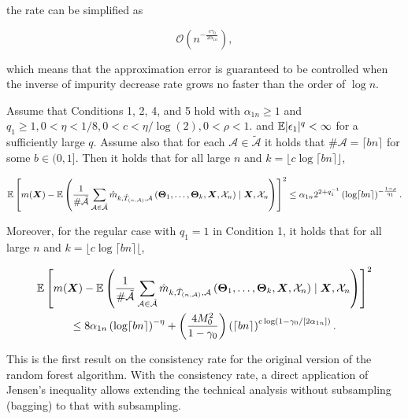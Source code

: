 the rate can be simplified as 

\[
\mathcal{O}\left(n^{- \frac{c \gamma_0}{2 \alpha_{1n}}} \right),
\]

which means that the approximation error is guaranteed to be controlled when the inverse of impurity decrease rate grows no faster than the order of \(\log n\).

\begin{theorem}\label{stat.learn.cons.rf.rates}

Assume that Conditions 1, 2, 4, and 5 hold with \(\alpha_{1n} \geq 1\) and \(q_1 \geq 1, 0 < \eta < 1/8, 0 < c < \eta/\log(2), 0 < \rho < 1\). and \(\mathbb{E} | \epsilon_1|^q < \infty\) for a sufficiently large \(q\). Assume also that for each \(\mathcal{A} \in \tilde{\mathcal{A}}\) it holds that \(\# \mathcal{A} = \lceil b n \rceil\) for some \(b \in (0,1]\). Then it holds that for all large \(n\) and \(k = \lfloor c \log \lceil b n \rceil \rfloor\),

\[
\mathbb{E} \left[ m(\boldsymbol{X}) - \mathbb{E} \left( \frac{1}{\# \tilde{\mathcal{A}}} \sum_{\mathcal{A} \in \tilde{\mathcal{A}}} \hat{m}_{k, \hat{T}_{(n, \mathcal{A})}, \mathcal{A}}\left(\boldsymbol{\Theta}_1, \ldots, \boldsymbol{\Theta}_k, \boldsymbol{X}, \mathcal{X}_n\right) \mid \boldsymbol{X}, \mathcal{X}_n  \right) \right]^2 \leq \alpha_{1n} 2^{2 + q_1^{-1}} \left( \log \lceil bn \rceil \right)^{-\frac{1 - \rho}{q_1}}.
\]

Moreover, for the regular case with \(q_1 = 1\) in Condition 1, it holds that for all large \(n\) and \(k = \lfloor c \log \lceil b n \rceil \lfloor\),

\begin{multline*}
\mathbb{E} \left[ m(\boldsymbol{X}) - \mathbb{E} \left( \frac{1}{\# \tilde{\mathcal{A}}} \sum_{\mathcal{A} \in \tilde{\mathcal{A}}} \hat{m}_{k, \hat{T}_{(n, \mathcal{A})}, \mathcal{A}}\left(\boldsymbol{\Theta}_1, \ldots, \boldsymbol{\Theta}_k, \boldsymbol{X}, \mathcal{X}_n\right) \mid \boldsymbol{X}, \mathcal{X}_n  \right) \right]^2
\\ \leq 8\alpha_{1n} \left( \log \lceil bn \rceil \right)^{-\eta} + \left(\frac{4 M_0^2}{1 - \gamma_0} \right)\left(\lceil b n \rceil \right)^{c \log \left(1 - \gamma_0/[2 \alpha_{1n}] \right)} .
\end{multline*}

\end{theorem}

This is the first result on the consistency rate for the original version of the random forest algorithm. With the consistency rate, a direct application of Jensen's inequality allows extending the technical analysis without subsampling (bagging) to that with subsampling. 

